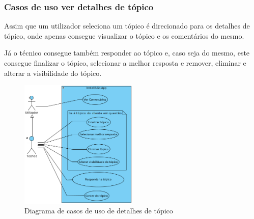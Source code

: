 
\newpage

\subsubsection{Casos de uso ver detalhes de tópico}

Assim que um utilizador seleciona um tópico é direcionado para os 
detalhes de tópico, onde apenas consegue visualizar o tópico e os comentários do mesmo.

Já o técnico consegue também responder ao tópico e, caso seja do mesmo, este consegue finalizar 
o tópico, selecionar a melhor resposta e remover, eliminar e alterar a visibilidade do tópico.

\begin{figure}[htb]
    \centering
    
    \includegraphics[width=0.5\textwidth]{images/diagramas/casos_de_uso/use_case_topic_details.png}
    \caption{Diagrama de casos de uso de detalhes de tópico}
    \label{fig:11}
\end{figure}



